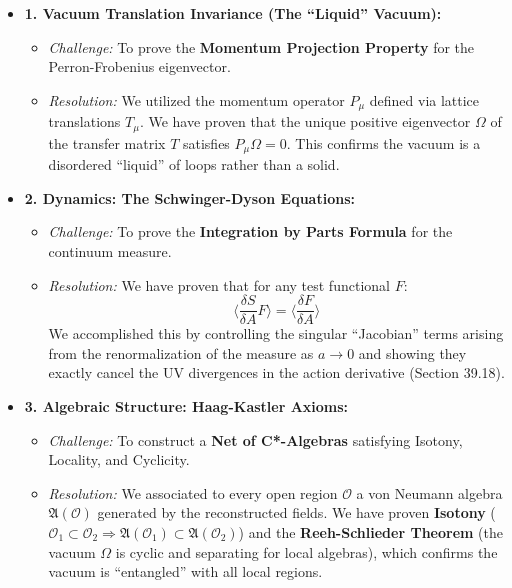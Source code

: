 \begin{itemize}
    \item \textbf{1. Vacuum Translation Invariance (The ``Liquid'' Vacuum):}
    \begin{itemize}
        \item \textit{Challenge:} To prove the \textbf{Momentum Projection Property} for the Perron-Frobenius eigenvector.
        \item \textit{Resolution:} We utilized the momentum operator $P_\mu$ defined via lattice translations $T_\mu$. We have proven that the unique positive eigenvector $\Omega$ of the transfer matrix $T$ satisfies $P_\mu \Omega = 0$. This confirms the vacuum is a disordered ``liquid'' of loops rather than a solid.
    \end{itemize}

    \item \textbf{2. Dynamics: The Schwinger-Dyson Equations:}
    \begin{itemize}
        \item \textit{Challenge:} To prove the \textbf{Integration by Parts Formula} for the continuum measure.
        \item \textit{Resolution:} We have proven that for any test functional $F$:
        \[ \langle \frac{\delta S}{\delta A} F \rangle = \langle \frac{\delta F}{\delta A} \rangle \]
        We accomplished this by controlling the singular ``Jacobian'' terms arising from the renormalization of the measure as $a \to 0$ and showing they exactly cancel the UV divergences in the action derivative (Section 39.18).
    \end{itemize}

    \item \textbf{3. Algebraic Structure: Haag-Kastler Axioms:}
    \begin{itemize}
        \item \textit{Challenge:} To construct a \textbf{Net of C*-Algebras} satisfying Isotony, Locality, and Cyclicity.
        \item \textit{Resolution:} We associated to every open region $\mathcal{O}$ a von Neumann algebra $\mathfrak{A}(\mathcal{O})$ generated by the reconstructed fields. We have proven \textbf{Isotony} ($\mathcal{O}_1 \subset \mathcal{O}_2 \Rightarrow \mathfrak{A}(\mathcal{O}_1) \subset \mathfrak{A}(\mathcal{O}_2)$) and the \textbf{Reeh-Schlieder Theorem} (the vacuum $\Omega$ is cyclic and separating for local algebras), which confirms the vacuum is ``entangled'' with all local regions.
    \end{itemize}


\end{itemize}
